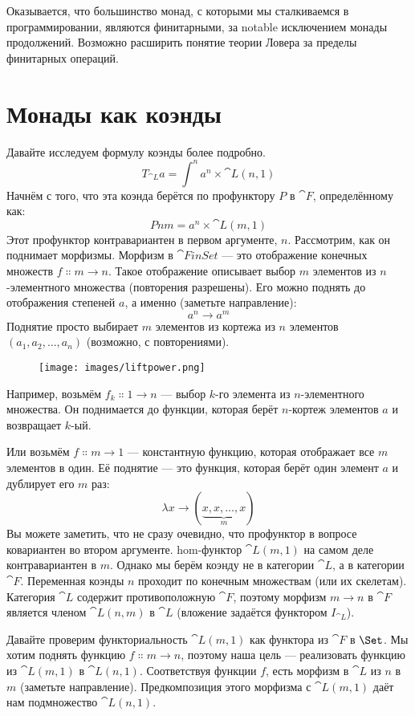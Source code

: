 Оказывается, что большинство монад, с которыми мы сталкиваемся в программировании, являются
финитарными, за notable исключением монады продолжений. Возможно
расширить понятие теории Ловера за пределы финитарных
операций.

\section{Монады как коэнды}

Давайте исследуем формулу коэнды более подробно.
\[T_{\cat{L}} a = \int^n a^n \times \cat{L}(n, 1)\]
Начнём с того, что эта коэнда берётся по профунктору $P$ в
$\cat{F}$, определённому как:
\[P n m = a^n \times \cat{L}(m, 1)\]
Этот профунктор контравариантен в первом аргументе, $n$.
Рассмотрим, как он поднимает морфизмы. Морфизм в $\cat{FinSet}$ — это
отображение конечных множеств $f \Colon m \to n$. Такое
отображение описывает выбор $m$ элементов из $n$-элементного множества
(повторения разрешены). Его можно поднять до отображения степеней
$a$, а именно (заметьте направление):
\[a^n \to a^m\]
Поднятие просто выбирает $m$ элементов из кортежа из $n$ элементов\\
$(a_1, a_2, \ldots{}, a_n)$ (возможно, с повторениями).

\begin{figure}[H]
  \centering
  \texttt{[image: images/liftpower.png]}
\end{figure}

\noindent
Например, возьмём $f_k \Colon 1 \to n$ ---
выбор $k$-го элемента из $n$-элементного множества. Он поднимается до
функции, которая берёт $n$-кортеж элементов $a$ и возвращает
$k$-ый.

Или возьмём $f \Colon m \to 1$ --- константную
функцию, которая отображает все $m$ элементов в один. Её поднятие — это функция, которая
берёт один элемент $a$ и дублирует его $m$ раз:
\[\lambda{}x \to (\underbrace{x, x, \ldots{}, x}_{m})\]
Вы можете заметить, что не сразу очевидно, что профунктор
в вопросе ковариантен во втором аргументе. hom-функтор
$\cat{L}(m, 1)$ на самом деле контравариантен в $m$. Однако мы
берём коэнду не в категории $\cat{L}$, а в категории
$\cat{F}$. Переменная коэнды $n$ проходит по конечным множествам (или их
скелетам). Категория $\cat{L}$ содержит противоположную
$\cat{F}$, поэтому морфизм $m \to n$ в $\cat{F}$
является членом $\cat{L}(n, m)$ в $\cat{L}$ (вложение задаётся
функтором $I_{\cat{L}}$).

Давайте проверим функториальность $\cat{L}(m, 1)$ как функтора из
$\cat{F}$ в $\Set$. Мы хотим поднять функцию
$f \Colon m \to n$, поэтому наша цель — реализовать
функцию из $\cat{L}(m, 1)$ в $\cat{L}(n, 1)$. Соответствуя
функции $f$, есть морфизм в $\cat{L}$ из
$n$ в $m$ (заметьте направление). Предкомпозиция этого
морфизма с $\cat{L}(m, 1)$ даёт нам подмножество
$\cat{L}(n, 1)$.

